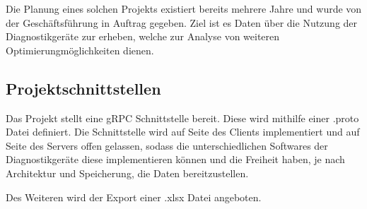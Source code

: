 Die Planung eines solchen Projekts existiert bereits mehrere Jahre und wurde von der Geschäftsführung in Auftrag gegeben. Ziel ist es Daten über die Nutzung der {\betriebNameKzf} Diagnostikgeräte zur erheben, welche zur Analyse von weiteren Optimierungmöglichkeiten dienen.

\subsection{Projektschnittstellen}
\label{sec:Projektschnittstellen}
Das Projekt stellt eine {\acs{gRPC}} Schnittstelle bereit. Diese wird mithilfe einer \glqq .proto\grqq \xspace Datei definiert. Die Schnittstelle wird auf Seite des Clients implementiert und auf Seite des Servers offen gelassen, sodass die unterschiedlichen Softwares der Diagnostikgeräte diese implementieren können und die Freiheit haben, je nach Architektur und Speicherung, die Daten bereitzustellen.

Des Weiteren wird der Export einer \glqq .xlsx\grqq \xspace Datei angeboten.